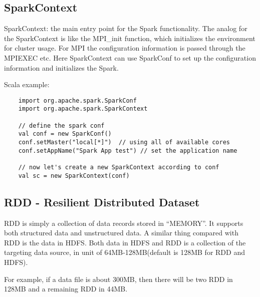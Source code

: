 \documentclass[notheorems, aspectratio=54]{beamer}
\begin{document}
\subsection{SparkContext}
\begin{frame}[fragile]

   \begin{block}{SparkContext: the main entry point for the Spark functionality.}
   The analog for the SparkContext  is like the MPI\_init function, which initializes the environment for cluster usage. 
   For MPI the configuration information is passed through the MPIEXEC etc. Here SparkContext can use SparkConf
   to set up the configuration information and initializes the Spark.
   \end{block}
   
   Scala example:
   \begin{verbatim}
    import org.apache.spark.SparkConf
    import org.apache.spark.SparkContext

    // define the spark conf
    val conf = new SparkConf()
    conf.setMaster("local[*]")  // using all of available cores 
    conf.setAppName("Spark App test") // set the application name

    // now let's create a new SparkContext according to conf
    val sc = new SparkContext(conf)
   \end{verbatim}     
  
\end{frame}

\subsection{RDD - Resilient Distributed Dataset}
\begin{frame}

RDD is simply a collection of data records stored in ``MEMORY''. It supports both structured data and unstructured data. 
A similar thing compared with RDD is the data in HDFS. Both data in HDFS and RDD 
is a collection of the targeting data source, in unit of 64MB-128MB(default is 128MB for RDD and HDFS).

For example, if a data file is about 300MB, then there will be two RDD in 128MB and a remaining RDD in 44MB.
  
\end{frame}
\end{document}
